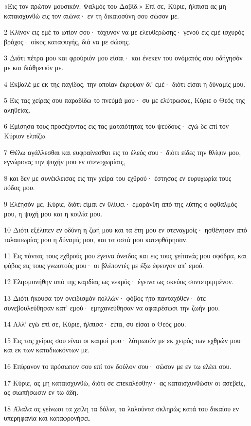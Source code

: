 \par «Εις τον πρώτον μουσικόν. Ψαλμός του Δαβίδ.» Επί σε, Κύριε, ήλπισα ας μη καταισχυνθώ εις τον αιώνα· εν τη δικαιοσύνη σου σώσον με.
\par 2 Κλίνον εις εμέ το ωτίον σου· τάχυνον να με ελευθερώσης· γενού εις εμέ ισχυρός βράχος· οίκος καταφυγής, διά να με σώσης.
\par 3 Διότι πέτρα μου και φρούριόν μου είσαι· και ένεκεν του ονόματός σου οδήγησόν με και διάθρεψόν με.
\par 4 Εκβαλέ με εκ της παγίδος, την οποίαν έκρυψαν δι' εμέ· διότι είσαι η δύναμίς μου.
\par 5 Εις τας χείρας σου παραδίδω το πνεύμά μου· συ με ελύτρωσας, Κύριε ο Θεός της αληθείας.
\par 6 Εμίσησα τους προσέχοντας εις τας ματαιότητας του ψεύδους· εγώ δε επί τον Κύριον ελπίζω.
\par 7 Θέλω αγάλλεσθαι και ευφραίνεσθαι εις το έλεός σου· διότι είδες την θλίψιν μου, εγνώρισας την ψυχήν μου εν στενοχωρίαις,
\par 8 και δεν με συνέκλεισας εις την χείρα του εχθρού· έστησας εν ευρυχωρία τους πόδας μου.
\par 9 Ελέησόν με, Κύριε, διότι είμαι εν θλίψει· εμαράνθη από της λύπης ο οφθαλμός μου, η ψυχή μου και η κοιλία μου.
\par 10 Διότι εξέλιπεν εν οδύνη η ζωή μου και τα έτη μου εν στεναγμοίς· ησθένησεν από ταλαιπωρίας μου η δύναμίς μου, και τα οστά μου κατεφθάρησαν.
\par 11 Εις πάντας τους εχθρούς μου έγεινα όνειδος και εις τους γείτονάς μου σφόδρα, και φόβος εις τους γνωστούς μου· οι βλέποντές με έξω έφευγον απ' εμού.
\par 12 Ελησμονήθην από της καρδίας ως νεκρός· έγεινα ως σκεύος συντετριμμένον.
\par 13 Διότι ήκουσα τον ονειδισμόν πολλών· φόβος ήτο πανταχόθεν· ότε συνεβουλεύθησαν κατ' εμού· εμηχανεύθησαν να αφαιρέσωσι την ζωήν μου.
\par 14 Αλλ' εγώ επί σε, Κύριε, ήλπισα· είπα, συ είσαι ο Θεός μου.
\par 15 Εις τας χείρας σου είναι οι καιροί μου· λύτρωσόν με εκ χειρός των εχθρών μου και εκ των καταδιωκόντων με.
\par 16 Επίφανον το πρόσωπον σου επί τον δούλον σου· σώσον με εν τω ελέει σου.
\par 17 Κύριε, ας μη καταισχυνθώ, διότι σε επεκαλέσθην· ας καταισχυνθώσιν οι ασεβείς, ας σιωπήσωσιν εν τω άδη.
\par 18 Άλαλα ας γείνωσι τα χείλη τα δόλια, τα λαλούντα σκληρώς κατά του δικαίου εν υπερηφανία και καταφρονήσει.
